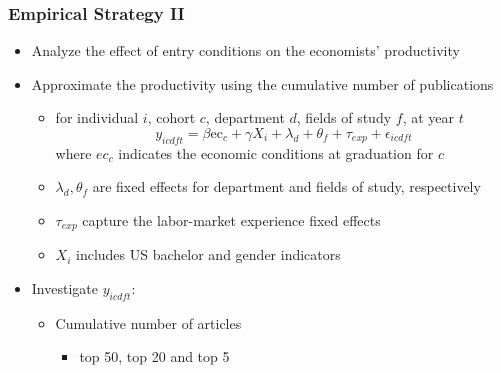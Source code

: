 \documentclass[10pt,svgnames,fragile]{beamer}
\begin{document}
\begin{frame}
	\frametitle{Empirical Strategy II}
	\begin{itemize}
		\item Analyze the effect of entry conditions on the economists' productivity
			\vfill
		\item Approximate the productivity using the cumulative number of publications
			\vfill
		\begin{itemize}
			\item for individual $i$, cohort $c$, department $d$, fields of study $f$, at year $t$
			\begin{equation}
				y_{icdft} = \beta \text{ec}_{c}+\gamma X_{i}+\lambda_{d}+\theta_f +\tau_{exp}  +\epsilon_{icdft}
			\end{equation}
			where $ec_c$ indicates the economic conditions at graduation for $c$
			\item $\lambda_{d},\theta_f $ are fixed effects for department and fields of study, respectively
			\item $\tau_{exp}$ capture the labor-market experience fixed effects 
			\item $X_i$ includes US bachelor and gender indicators
		\end{itemize}
			\vfill
		\item Investigate $y_{icdft}$:
		\begin{itemize}
			\item Cumulative number of articles
			\begin{itemize}
				\item top 50, top 20 and top 5
			\end{itemize}
				\vfill
		\end{itemize}
	\end{itemize}
\end{frame}
\end{document}
